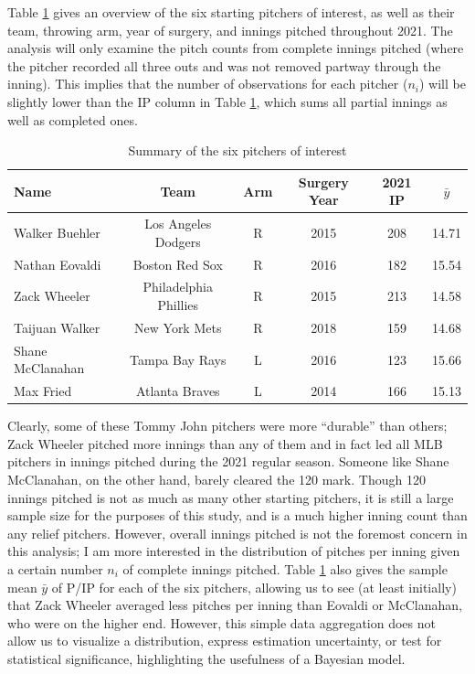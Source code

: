 \documentclass{article}
\begin{document}
Table \ref{tab:summary} gives an overview of the six starting pitchers of interest, as well as their team, throwing arm, year of surgery, and innings pitched throughout 2021. The analysis will only examine the pitch counts from complete innings pitched (where the pitcher recorded all three outs and was not removed partway through the inning). This implies that the number of observations for each pitcher ($n_i$) will be slightly lower than the IP column in Table \ref{tab:summary}, which sums all partial innings as well as completed ones.

\begin{table}[h]
    \centering
    \begin{tabular}{lccccc}
         \hline
         Name & Team & Arm & Surgery Year & 2021 IP & $\bar{y}$ \\
         \hline
         Walker Buehler & Los Angeles Dodgers & R & 2015 & 208 & 14.71 \\
         Nathan Eovaldi & Boston Red Sox & R & 2016 & 182 & 15.54 \\
         Zack Wheeler & Philadelphia Phillies & R & 2015 & 213 & 14.58 \\
         Taijuan Walker & New York Mets & R & 2018 & 159 & 14.68 \\
         Shane McClanahan & Tampa Bay Rays & L & 2016 & 123 & 15.66 \\
         Max Fried & Atlanta Braves & L & 2014 & 166 & 15.13 \\
         \hline
    \end{tabular}
    \caption{Summary of the six pitchers of interest}
    \label{tab:summary}
\end{table}

Clearly, some of these Tommy John pitchers were more ``durable'' than others; Zack Wheeler pitched more innings than any of them and in fact led all MLB pitchers in innings pitched during the 2021 regular season. Someone like Shane McClanahan, on the other hand, barely cleared the 120 mark. Though 120 innings pitched is not as much as many other starting pitchers, it is still a large sample size for the purposes of this study, and is a much higher inning count than any relief pitchers. However, overall innings pitched is not the foremost concern in this analysis; I am more interested in the distribution of pitches per inning given a certain number $n_i$ of complete innings pitched. Table \ref{tab:summary} also gives the sample mean $\bar{y}$ of P/IP for each of the six pitchers, allowing us to see (at least initially) that Zack Wheeler averaged less pitches per inning than Eovaldi or McClanahan, who were on the higher end. However, this simple data aggregation does not allow us to visualize a distribution, express estimation uncertainty, or test for statistical significance, highlighting the usefulness of a Bayesian model.
\end{document}
